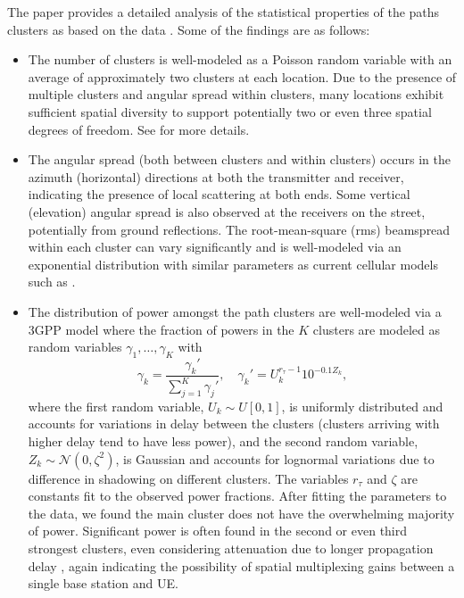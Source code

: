 \documentclass[journal]{IEEEtran}
\def\beq{\begin{equation}}
\def\eeq{\end{equation}}
\begin{document}
The paper \cite{AkLiuRanRapEr:13-arxiv} provides a detailed analysis of the
statistical properties of the paths clusters as based
on the data  \cite{rappaportmillimeter,ben2011millimeter,Rappaport:12-28G,Rappaport:28NYCPenetrationLoss,Samimi:AoAD,Nie72G-PIMRC:13,Rappaport:13-BBmmW}.  Some of the findings are as follows:
\begin{itemize}
\item The number of clusters is well-modeled as a Poisson random variable
with an average of approximately two clusters at each location.
Due to the presence of multiple clusters and angular spread within clusters,
many locations exhibit sufficient spatial diversity to support
potentially two or even three spatial degrees of freedom.
See \cite{AkLiuRanRapEr:13-arxiv} for more details.

\item The angular spread (both between clusters and within clusters)
occurs in the azimuth (horizontal) directions at
both the transmitter and receiver, indicating the presence of local scattering
at both ends.  Some vertical (elevation) angular spread is also observed
at the receivers on the street, potentially from ground reflections.
The root-mean-square (rms) beamspread within each cluster can vary
significantly and is well-modeled via an exponential distribution
with similar parameters as current cellular models such as \cite{3GPP36.814}.

\item The distribution of power amongst the path clusters are well-modeled
via a 3GPP model \cite{3GPP36.814} where the fraction of powers in the $K$
clusters are modeled as random variables $\gamma_1,\ldots,\gamma_K$ with
\beq \label{eq:powFrac}
    \gamma_k = \frac{\gamma_k'}{\sum_{j=1}^K \gamma_j'}, \quad
    \gamma_k' = U_k^{r_\tau-1}10^{-0.1Z_k},
\eeq
where  the first random variable, $U_k\sim U[0,1]$, is uniformly distributed and
accounts for variations in delay
between the clusters (clusters arriving with higher delay tend to have less power),
and the second random variable, $Z_k \sim {\mathcal N}(0,\zeta^2)$, is Gaussian
and accounts for lognormal variations due to difference in shadowing
on different clusters.  The variables $r_\tau$ and $\zeta$ are constants fit
to the observed power fractions.
After fitting the parameters to the data, we found
the main cluster does not have the overwhelming majority of power.  Significant
power is often found in the second or even third strongest clusters,
even considering attenuation due to longer propagation delay \cite{AkLiuRanRapEr:13-arxiv},
again indicating the possibility of spatial multiplexing gains between a single base station
and UE.
\end{itemize}
\end{document}
